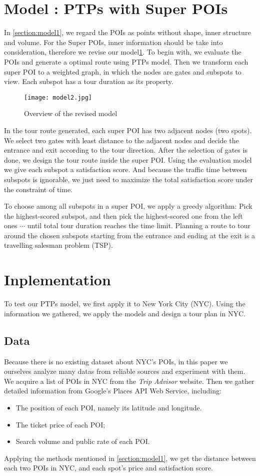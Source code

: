 \documentclass{mcmthesis}
\newcommand{\RNum}[1]{\uppercase\expandafter{\romannumeral #1\relax}}
\begin{document}
\section{Model \RNum{2}: PTPs with Super POIs} \label{section:model2}
  In \ref{section:model1}, we regard the POIs as points without shape, inner structure and volume. For the Super POIs, inner information should be take into consideration, therefore we revise our model\ref{fig:model2}. To begin with, we evaluate the POIs and generate a optimal route using PTPs model. Then we transform each super POI to a weighted graph, in which the nodes are gates and subspots to view. Each subspot has a tour duration as its property. \par
  \begin{figure}[ht]
    \centering
    \texttt{[image: model2.jpg]}
    \caption{Overview of the revised model}
    \label{fig:model2}
  \end{figure}
  In the tour route generated, each super POI has two adjacent nodes (two spots). We select two gates with least distance to the adjacent nodes and decide the entrance and exit according to the tour direction. After the selection of gates is done, we design the tour route inside the super POI. Using the evaluation model we give each subspot a satisfaction score. And because the traffic time between subspots is ignorable, we just need to maximize the total satisfaction score under the constraint of time. \par
  To choose among all subspots in a super POI, we apply a greedy algorithm: Pick the highest-scored subspot, and then pick the highest-scored one from the left ones $\cdots$ until total tour duration reaches the time limit. Planning a route to tour around the chosen subspots starting from the entrance and ending at the exit is a travelling salesman problem (TSP).




\section{Inplementation}
  To test our PTPs model, we first apply it to New York City (NYC). Using the information we gathered, we apply the models and design a tour plan in NYC.
\subsection{Data}
  Because there is no existing dataset about NYC's POIs, in this paper we ourselves analyze many datas from reliable sources and experiment with them. We acquire a list of POIs in NYC from the \emph{Trip Advisor} website\cite{TripAdv}. Then we gather detailed information from Google's Places API Web Service\cite{GMaps}, including:
  \begin{itemize}
    \item The position of each POI, namely its latitude and longitude.
    \item The ticket price of each POI;
    \item Search volume and public rate of each POI.
  \end{itemize}
  Applying the methods mentioned in \ref{section:model1}, we get the distance between each two POIs in NYC, and each spot's price and satisfaction score. 
\end{document}
